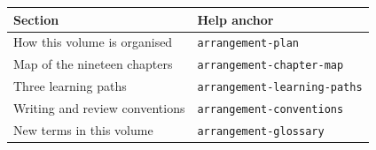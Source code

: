 \begin{helpmapping}
\begin{longtable}{p{}p{}}
\toprule
Section & Help anchor \\
\midrule
How this volume is organised & \texttt{arrangement-plan} \\
Map of the nineteen chapters & \texttt{arrangement-chapter-map} \\
Three learning paths & \texttt{arrangement-learning-paths} \\
Writing and review conventions & \texttt{arrangement-conventions} \\
New terms in this volume & \texttt{arrangement-glossary} \\
\bottomrule
\end{longtable}
\end{helpmapping}
